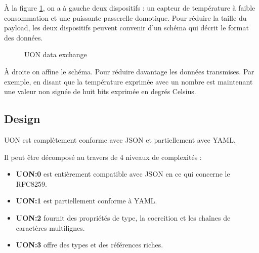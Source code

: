\documentclass[
    iict, %
    il, %
]{heig-tb}
\begin{document}
\vspace{\parskip}

À la figure \ref*{data-exchange}, on a à gauche deux dispositifs : un capteur de température à faible consommation
et une puissante passerelle domotique. Pour réduire la taille du payload, les deux dispositifs peuvent convenir d'un schéma qui décrit le format des données.

\begin{figure}[!h]
    \begin{center}
    \end{center}
    \caption[UON data exchange]{\label{data-exchange}UON data exchange}
\end{figure}

À droite on affine le schéma. Pour réduire davantage les données transmises.
Par exemple, en disant que la température exprimée avec un nombre est maintenant une valeur non signée de huit bits exprimée en degrés Celsius.

\subsection{Design}
UON est complètement conforme avec JSON et partiellement avec YAML.

Il peut être décomposé au travers de 4 niveaux de complexités :
\begin{itemize}
    \item \textbf{UON:0} est entièrement compatible avec JSON en ce qui concerne le RFC8259.
    \item \textbf{UON:1} est partiellement conforme à YAML.
    \item \textbf{UON:2} fournit des propriétés de type, la coercition et les chaînes de caractères multilignes.
    \item \textbf{UON:3} offre des types et des références riches.
\end{itemize}
\end{document}
